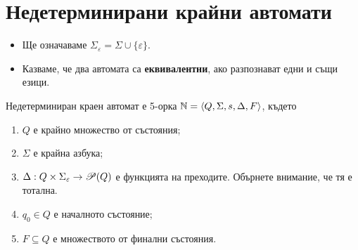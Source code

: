 \section{Недетерминирани крайни автомати}

\begin{itemize}
\item
  Ще означаваме $\Sigma_\varepsilon = \Sigma\cup\{\varepsilon\}$.
\item
  Казваме, че два автомата са {\bf еквивалентни}, ако разпознават едни и същи езици.  
\end{itemize}

\begin{dfn}
  Недетерминиран краен автомат е 5-орка $\mathbb{N} = \langle{Q,\Sigma,s,\Delta,F}\rangle$, където
  \begin{enumerate}[1)]
  \item
    $Q$ е крайно множество от състояния;
  \item
    $\Sigma$ е крайна азбука;
  \item
    $\Delta: Q\times\Sigma_\varepsilon \to \mathscr{P}(Q)$ е функцията на преходите.
    Обърнете внимание, че тя е тотална.
  \item
    $q_0\in Q$ е началното състояние;
  \item
    $F\subseteq Q$ е множеството от финални състояния.
  \end{enumerate}
\end{dfn}

